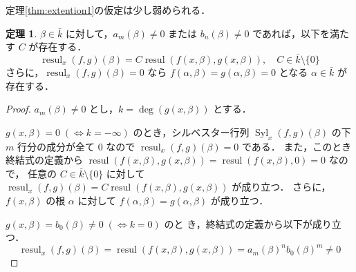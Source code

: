 \documentclass[12pt, uplatex, dvipdfmx]{jsarticle}
\theoremstyle{definition}
\newtheorem{theorem}{定理}
\DeclareMathOperator{\Syl}{Syl}
\DeclareMathOperator{\resul}{resul}
\begin{document}
定理\ref{thm:extention1}の仮定は少し弱められる．

\begin{theorem}\label{thm:extention2}
  $\beta \in \bar{k}$ に対して，$a_m(\beta) \neq 0$ または $b_n(\beta) \neq 0$ であれば，以下を満たす $C$ が存在する．
  \[
    \resul_x(f,g)(\beta) = C \resul(f(x,\beta), g(x,\beta)), \quad C \in \bar{k}\setminus \{0\}
  \]
  さらに，$\resul_x(f,g)(\beta)=0$ なら $f(\alpha,
  \beta)=g(\alpha,\beta)=0$ となる $\alpha \in \bar{k}$ が存在する．
\end{theorem}

\begin{proof}
  $a_m(\beta) \neq 0$ とし，$k=\deg(g(x,\beta))$ とする．

  $g(x,\beta)=0 \; (\Leftrightarrow k=-\infty)$ のとき，シルベスター行列 $\Syl_x(f,g)(\beta)$
  の下 $m$ 行分の成分が全て $0$ なので $\resul_x(f,g)(\beta)=0$ である．
  また，このとき終結式の定義から
  $\resul(f(x,\beta), g(x,\beta)) = \resul(f(x,\beta), 0) = 0$ なので，
  任意の $C \in \bar{k}\setminus \{0\}$ に対して
  $\resul_x(f,g)(\beta) = C \resul(f(x,\beta), g(x,\beta))$ が成り立つ．
  さらに，$f(x,\beta)$ の根 $\alpha$ に対して
  $f(\alpha, \beta) = g(\alpha,\beta)$ が成り立つ．

  $g(x,\beta) = b_0(\beta) \neq 0 \; (\Leftrightarrow k=0)$ のと
  き，終結式の定義から以下が成り立つ．
  \[
    \resul_x(f,g)(\beta)= \resul(f(x,\beta),g(x,\beta))= a_m(\beta)^n
    b_0(\beta)^m \neq 0
  \]


\end{proof}
\end{document}
